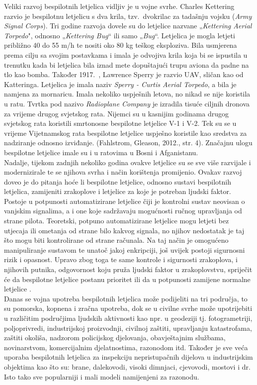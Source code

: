\documentclass[times, utf8, diplomski]{fer}
\begin{document}
Veliki razvoj bespilotnih letjelica vidljiv je u vojne svrhe. Charles  Kettering  razvio  je  bespilotnu  letjelicu  s  dva  krila, tzv.~dvokrilac za tadašnju vojsku (\emph{Army Signal Corps}). Tri godine razvoja dovele su do letjelice nazvane „\emph{Kettering Aerial Torpedo}", odnosno „\emph{Kettering Bug}“ ili samo „\emph{Bug}“. Letjelica je mogla letjeti približno 40 do 55 m/h te nositi oko 80 kg teškog eksploziva. Bila usmjerena prema cilju sa svojim postavkama i imala  je  odvojiva  krila  koja  bi  se ispustila u  trenutku kada  bi  letjelica  bila iznad  mete dopuštajući trupu aviona da padne na tlo kao bomba.  Također 1917.~, Lawrence Sperry je razvio UAV, sličan kao od Katteringa. Letjelica je imala naziv \emph{Sperry - Curtis Aerial Torpedo}, a bila je namjena za mornaricu. Imala nekoliko uspješnih letova, no nikad se nije koristila u ratu. Tvrtka pod nazivo \emph{Radioplane Company} je izradila tisuće ciljnih dronova  za vrijeme drugog svjetskog rata. Nijemci su u kasnijim godinama drugog svjetskog rata koristili smrtonosne bespilotne letjelice V-1 i V-2. Tek su se u vrijeme Vijetnamskog rata bespilotne letjelice uspješno koristile kao sredstva za nadziranje odnosno izviđanje. (Fahlstrom, Gleason, 2012., str. 4). Značajnu ulogu bespilotne letjelice imale su i u ratovima u Bosni i Afganistanu.\\
Nadalje, tijekom zadnjih nekoliko godina ovakve letjelice su se sve više razvijale i modernizirale te se njihova svrha i način korištenja promijenio. Ovakav razvoj doveo je do pitanja hoće li bespilotne letjelice, odnosno sustavi bespilotnih letjelica, zamijeniti zrakoplove i letjelice za koje je potreban ljudski faktor. Postoje u potpunosti automatizirane letjelice čiji je kontrolni sustav neovisan o vanjskim signalima, a i one koje sadržavaju mogućnosti ručnog upravljanja  od  strane  pilota.  Teoretski,  potpuno  automatizirane  letjelice  mogu  letjeti  bez utjecaja ili ometanja od strane bilo kakvog signala, no njihov nedostatak je taj što mogu biti kontrolirane od strane računala. Na taj način je omogućeno manipuliranje sustavom te unatoč jakoj enkripciji,  još  uvijek  postoji  sigurnosni  rizik  i  opasnost.  Upravo  zbog  toga  te  same kontrole  i  sigurnosti  zrakoplova, i njihovih putnika, odgovornost koju pruža ljudski faktor u zrakoplovstvu, spriječit će da bespilotne letjelice postanu prioritet ili da u potpunosti zamijene normalne letjelice \citep{UAVSystems}.\\
Danas se vojna upotreba bespilotnih letjelica može 
podijeliti na tri područja, to su pomorska, kopnena i zračna upotreba, dok se u civilne  svrhe  može  upotrijebiti  u  različitim  područjima ljudskih  aktivnosti  kao  npr.  u  geodeziji  tj. fotogrametriji,   poljoprivredi,   industrijskoj proizvodnji,  civilnoj  zaštiti,  upravljanju katastrofama,  zaštiti  okoliša,  nadzorom policijskog    djelovanja,    obavještajnim službama,   novinarstvom,   komercijalnim djelatnostima, razonodom itd. Također  je  sve  veća  uporaba  bespilotnih letjelica za inspekciju   nepristupačnih dijelova  u industrijskim  objektima  kao  što su: brane, dalekovodi, visoki dimnjaci, cjevovodi, mostovi i dr. Isto tako sve popularniji i mali modeli namijenjeni za razonodu.
\end{document}
